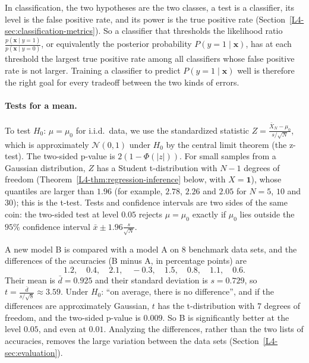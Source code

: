 In classification, the two hypotheses are the two classes, a test is a classifier, its level is the false positive rate, and its power is the true positive rate (Section~\ref{L4-sec:classification-metrics}). So a classifier that thresholds the likelihood ratio $\frac{p(\mathbf{x} \mid y = 1)}{p(\mathbf{x} \mid y = 0)}$, or equivalently the posterior probability $P(y = 1 \mid \mathbf{x})$, has at each threshold the largest true positive rate among all classifiers whose false positive rate is not larger. Training a classifier to predict $P(y = 1 \mid \mathbf{x})$ well is therefore the right goal for every tradeoff between the two kinds of errors.

\paragraph{Tests for a mean.} To test $H_0$: $\mu = \mu_0$ for i.i.d.\ data, we use the standardized statistic $Z = \frac{\bar X_N - \mu_0}{s/\sqrt{N}}$, which is approximately $\mathcal{N}(0, 1)$ under $H_0$ by the central limit theorem (the z-test). The two-sided p-value is $2(1 - \Phi(|z|))$. For small samples from a Gaussian distribution, $Z$ has a Student t-distribution with $N - 1$ degrees of freedom (Theorem~\ref{L4-thm:regression-inference} below, with $X = \mathbf{1}$), whose quantiles are larger than $1.96$ (for example, $2.78$, $2.26$ and $2.05$ for $N = 5$, $10$ and $30$); this is the t-test. Tests and confidence intervals are two sides of the same coin: the two-sided test at level $0.05$ rejects $\mu = \mu_0$ exactly if $\mu_0$ lies outside the $95\%$ confidence interval $\bar x \pm 1.96\frac{s}{\sqrt{N}}$.

\begin{example}\label{L4-ex:t-test}
    A new model B is compared with a model A on $8$ benchmark data sets, and the differences of the accuracies (B minus A, in percentage points) are
    \[1.2, \quad 0.4, \quad 2.1, \quad -0.3, \quad 1.5, \quad 0.8, \quad 1.1, \quad 0.6.\]
    Their mean is $\bar d = 0.925$ and their standard deviation is $s = 0.729$, so $t = \frac{\bar d}{s/\sqrt{8}} \approx 3.59$. Under $H_0$: ``on average, there is no difference'', and if the differences are approximately Gaussian, $t$ has the t-distribution with $7$ degrees of freedom, and the two-sided p-value is $0.009$. So B is significantly better at the level $0.05$, and even at $0.01$. Analyzing the differences, rather than the two lists of accuracies, removes the large variation between the data sets (Section~\ref{L4-sec:evaluation}).
\end{example}

